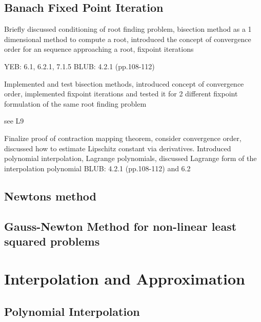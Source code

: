 \documentclass{article}
\theoremstyle{remark}
\begin{document}
\subsection{Banach Fixed Point Iteration}%
\label{sub:banach_fixed_point_iteration}
\begin{tcolorbox}
  Briefly discussed conditioning of root finding problem, bisection method as a 1 dimensional method to compute a root, introduced the concept of convergence order for an sequence approaching a root, fixpoint iterations
  \par
  YEB: 6.1, 6.2.1, 7.1.5
  BLUB: 4.2.1 (pp.108-112)
\end{tcolorbox}

\begin{tcolorbox}
  Implemented and test bisection methods, introduced concept of convergence order, implemented fixpoint iterations and tested it for 2 different fixpoint formulation of the same root finding problem 
  \par
  see L9
\end{tcolorbox}

\begin{tcolorbox}
  Finalize proof of contraction mapping theorem, consider convergence order, discussed how to estimate Lipschitz constant via derivatives. Introduced polynomial interpolation, Lagrange polynomials, discussed Lagrange form of the interpolation polynomial	
  BLUB: 4.2.1 (pp.108-112) and 6.2
\end{tcolorbox}
\subsection{Newtons method}%
\label{sub:newtons_method}

\subsection{Gauss-Newton Method for non-linear least squared problems}%
\label{sub:gauss_newton_method_for_non_linear_least_squared_problems}

\newpage
\section{Interpolation and Approximation}%
\label{sec:interpolation_and_approximation}

\subsection{Polynomial Interpolation}%
\label{sub:polynomial_interpolation}
\end{document}
